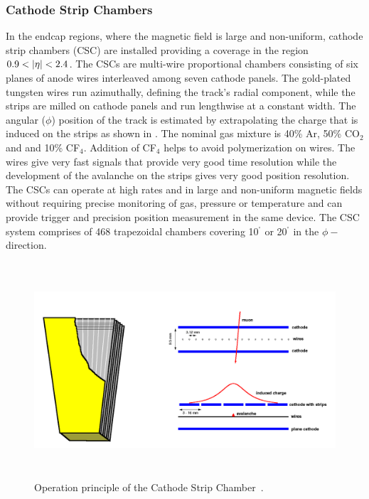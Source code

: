 \subsubsection{Cathode Strip Chambers}
In the endcap regions, where the magnetic field is large and non-uniform, cathode strip chambers (CSC) are installed providing a coverage in the 
region $0.9<\lvert \eta \rvert<2.4$. The CSCs are multi-wire proportional chambers consisting of six planes of anode wires interleaved among seven cathode 
panels. The gold-plated tungsten wires run azimuthally, defining the track's radial component, while the strips are milled on cathode panels and run 
lengthwise at a constant \dphi width. The angular ($\phi$) position of the track is estimated by extrapolating the charge that is induced on the 
strips as shown in \fig{\ref{fig:cmsCSC}}. The nominal gas mixture is 40\% Ar, 50\% CO$_{2}$ and and 10\% CF$_{4}$. Addition of CF$_{4}$ helps to 
avoid polymerization on wires. The wires give very fast signals that provide very good time resolution while the development of the avalanche on 
the strips gives very good position resolution. The CSCs can operate at high rates and in large and non-uniform magnetic fields without requiring 
precise monitoring of gas, pressure or temperature and can provide trigger and precision position measurement in the same device. The CSC system 
comprises of 468 trapezoidal chambers covering 10$^{^{\circ}}$ or 20$^{^{\circ}}$ in the $\phi-$direction.
\begin{figure}[h!]
 \centering
 \includegraphics[width=13cm,height=8cm]{ch2/figures/csc.png}
 \caption{Operation principle of the Cathode Strip Chamber~\cite{Web:CERNcds}.}
 \label{fig:cmsCSC}
\end{figure}

